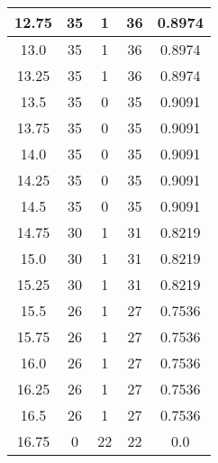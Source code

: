 \documentclass[letterpaper, 12pt]{article}
\begin{document}
\begin{longtable}{|c|c|c|c|c|}
\hline
12.75 & 35 & 1 & 36 & 0.8974 \\
\hline
13.0 & 35 & 1 & 36 & 0.8974 \\
\hline
13.25 & 35 & 1 & 36 & 0.8974 \\
\hline
13.5 & 35 & 0 & 35 & 0.9091 \\
\hline
13.75 & 35 & 0 & 35 & 0.9091 \\
\hline
14.0 & 35 & 0 & 35 & 0.9091 \\
\hline
14.25 & 35 & 0 & 35 & 0.9091 \\
\hline
14.5 & 35 & 0 & 35 & 0.9091 \\
\hline
14.75 & 30 & 1 & 31 & 0.8219 \\
\hline
15.0 & 30 & 1 & 31 & 0.8219 \\
\hline
15.25 & 30 & 1 & 31 & 0.8219 \\
\hline
15.5 & 26 & 1 & 27 & 0.7536 \\
\hline
15.75 & 26 & 1 & 27 & 0.7536 \\
\hline
16.0 & 26 & 1 & 27 & 0.7536 \\
\hline
16.25 & 26 & 1 & 27 & 0.7536 \\
\hline
16.5 & 26 & 1 & 27 & 0.7536 \\
\hline
16.75 & 0 & 22 & 22 & 0.0 \\
\hline
\end{longtable}
\end{document}
